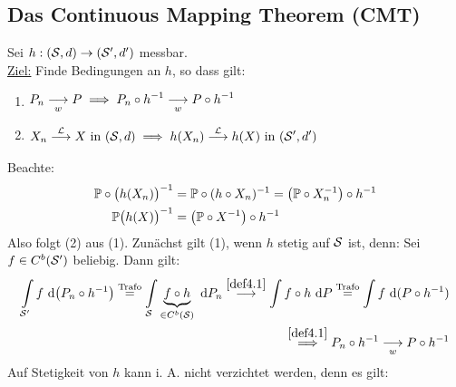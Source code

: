 \subsection*{Das Continuous Mapping Theorem (CMT)}
Sei $h:(\S,d)\to(\S',d')$ messbar.\\
\underline{Ziel:} Finde Bedingungen an $h$, so dass gilt:
\begin{enumerate}[label=(\arabic*)]
\item $\begin{aligned}
P_n\stackrelnew{w}{}{\longrightarrow}P\implies P_n\circ h^{-1}\stackrelnew{w}{}{\longrightarrow} P\circ h^{-1}
\end{aligned}$
\item $\begin{aligned}
X_n\stackrel{\L}{\longrightarrow} X\text{ in }(\S,d)\implies h(X_n)\stackrel{\L}{\longrightarrow} h(X)\text{ in }(\S',d')
\end{aligned}$
\end{enumerate}
Beachte: 
\begin{align*}
\P\circ\big(h(X_n)\big)^{-1}&=\P\circ(h\circ X_n)^{-1}=\big(\P\circ X_n^{-1}\big)\circ h^{-1}\\
\P\big(h(X)\big)^{-1}&=\big(\P\circ X^{-1}\big)\circ h^{-1}
\end{align*}
Also folgt (2) aus (1). Zunächst gilt (1), wenn $h$ stetig auf $\S$  ist, denn: Sei $f\in C^b(\S')$ beliebig. Dann gilt:
\begin{align*}
\int\limits_{\S'} f\d \big(P_n\circ h^{-1}\big)
\stackeq{\text{Trafo}}
\int\limits_{\S} \underbrace{ f\circ h}_{\in C^b(\S)}\d P_n
\stackrel{\ref{def4.1}}{\longrightarrow}\int\limits f\circ h\d P
\stackeq{\text{Trafo}}
\int\limits f\d(P\circ h^{-1})\\
\stackrel{\ref{def4.1}}{\implies}
P_n\circ h^{-1}\stackrelnew{w}{}{\longrightarrow} P\circ h^{-1}
\end{align*}
Auf Stetigkeit von $h$ kann i. A. nicht verzichtet werden, denn es gilt:
